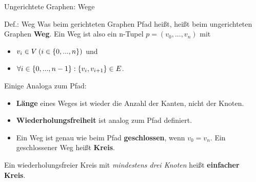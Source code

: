 \begin{frame}{Ungerichtete Graphen: Wege}
	\begin{block}{Def.: Weg}
		Was beim gerichteten Graphen Pfad heißt, heißt beim ungerichteten Graphen \textbf{Weg}. Ein Weg ist also ein n-Tupel $p=(v_0,...,v_n)$ mit
		\begin{itemize}
		 	\item $v_i\in V \: (i\in\left\{ 0,...,n \right\})$ und
		 	\item $\forall i \in \left\{ 0,...,n-1 \right\}: \left\{ v_i,v_{i+1} \right\} \in E$.
		\end{itemize}
		\medskip
		\pause
		Einige Analoga zum Pfad:
		\begin{itemize}
			\item \textbf{Länge} eines Weges ist wieder die Anzahl der Kanten, nicht der Knoten.\\
			\item \textbf{Wiederholungsfreiheit} ist analog zum Pfad definiert.
			\item Ein Weg ist genau wie beim Pfad \textbf{geschlossen}, wenn $v_0 = v_n$. Ein geschlossener Weg heißt \textbf{Kreis}.
		\end{itemize}
		Ein wiederholungsfreier Kreis mit \emph{mindestens drei Knoten} heißt \textbf{einfacher Kreis}.
	\end{block}
\end{frame}


